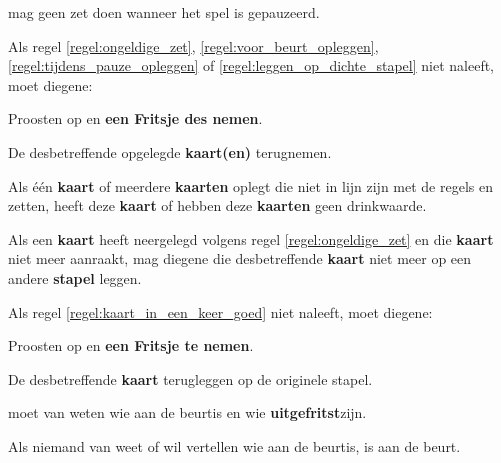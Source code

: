 \vervolgLijst{}
\item \EenSpeler mag geen zet doen wanneer het spel is gepauzeerd\footnotemark[2].
\label{regel:tijdens_pauze_opleggen}
\eindLijst{}

\vervolgLijst{}
\item Als \eenSpeler regel \ref{regel:ongeldige_zet}, \ref{regel:voor_beurt_opleggen}, \ref{regel:tijdens_pauze_opleggen} of \ref{regel:leggen_op_dichte_stapel} niet naleeft, moet diegene:
\puntLijst{}
\item Proosten op  en \textbf{een Fritsje des nemen}\footnotemark[3].
\item De desbetreffende opgelegde \textbf{kaart(en)} terugnemen.
\eindPuntLijst{}
\label{regel:kaarten_terugnemen_2}
\eindLijst{}

\vervolgLijst{}
\item Als \eenSpeler één \textbf{kaart} of meerdere \textbf{kaarten} oplegt die niet in lijn zijn met de regels en zetten, heeft deze \textbf{kaart} of hebben deze \textbf{kaarten} geen drinkwaarde.
\eindLijst{}


\vervolgLijst{}
\item Als \eenSpeler een \textbf{kaart} heeft neergelegd volgens regel \ref{regel:ongeldige_zet} en die \textbf{kaart} niet meer aanraakt, mag diegene die desbetreffende \textbf{kaart} niet meer op een andere \textbf{stapel} leggen.
\label{regel:kaart_in_een_keer_goed}
\eindLijst{}

\vervolgLijst{}
\item Als \eenSpeler regel \ref{regel:kaart_in_een_keer_goed} niet naleeft, moet diegene:
\puntLijst{}
\item Proosten op  en \textbf{een Fritsje te nemen}\footnotemark[3].
\item De desbetreffende \textbf{kaart} terugleggen op de originele stapel.
\eindPuntLijst{}
\eindLijst{}


\vervolgLijst{}
\item \EenSpeler moet van \alleSpelers weten wie aan de beurt\footnotemark[1] is en wie \textbf{uitgefritst}\footnotemark[4] zijn.
\eindLijst{}

\vervolgLijst{}
\item Als niemand van \alleSpelers weet of wil vertellen wie aan de beurt\footnotemark[1] is, is \Frits aan de beurt\footnotemark[1].
\eindLijst{}

